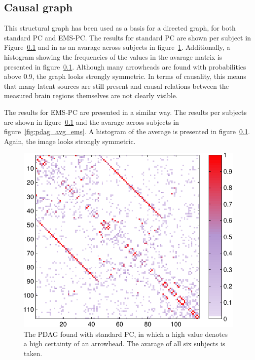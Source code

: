 \documentclass[a4paper, 10pt, english, onecolumn]{article}
\begin{document}
\subsection{Causal graph}
This structural graph has been used as a basis for a directed graph, for both standard PC and EMS-PC.
The results for standard PC are shown per subject in Figure~\ref{} and in as an avarage across subjects in figure~\ref{fig:pdag_avg_mod}.
Additionally, a histogram showing the frequencies of the values in the avarage matrix is presented in figure~\ref{}.
Although many arrowheads are found with probabilities above 0.9, the graph looks strongly symmetric.
In terms of causality, this means that many latent sources are still present and causal relations between the measured brain regions themselves are not clearly visible.

The results for EMS-PC are presented in a similar way. The results per subjects are shown in figure~\ref{} and the avarage across subjects in figure~\ref{fig:pdag_avg_ems}. A histogram of the average is presented in figure~\ref{}. Again, the image looks strongly symmetric.

\begin{figure}[h!]
  \centering
  \includegraphics{images/pdag_avg_colored_mod}
  \caption{The PDAG found with standard PC, in which a high value denotes a high certainty of an arrowhead. The avarage of all six subjects is taken.}
  \label{fig:pdag_avg_mod}
\end{figure}
\end{document}
